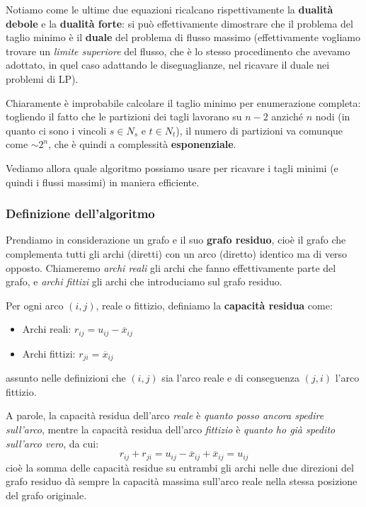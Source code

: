 \documentclass[a4paper,11pt]{article}
\begin{document}
Notiamo come le ultime due equazioni ricalcano rispettivamente la \textbf{dualità debole} e la \textbf{dualità forte}: si può effettivamente dimostrare che il problema del taglio minimo è il \textbf{duale} del problema di flusso massimo (effettivamente vogliamo trovare un \textit{limite superiore} del flusso, che è lo stesso procedimento che avevamo adottato, in quel caso adattando le diseguaglianze, nel ricavare il duale nei problemi di LP).

Chiaramente è improbabile calcolare il taglio minimo per enumerazione completa: togliendo il fatto che le partizioni dei tagli lavorano su $n-2$ anziché $n$ nodi (in quanto ci sono i vincoli $s \in N_s$ e $t \in N_t$), il numero di partizioni va comunque come $\sim 2^n$, che è quindi a complessità \textbf{esponenziale}.

Vediamo allora quale algoritmo possiamo usare per ricavare i tagli minimi (e quindi i flussi massimi) in maniera efficiente.

\subsubsection{Definizione dell'algoritmo}
Prendiamo in considerazione un grafo e il suo \textbf{grafo residuo}, cioè il grafo che complementa tutti gli archi (diretti) con un arco (diretto) identico ma di verso opposto. 
Chiameremo \textit{archi reali} gli archi che fanno effettivamente parte del grafo, e \textit{archi fittizi} gli archi che introduciamo sul grafo residuo. 

Per ogni arco $(i,j)$, reale o fittizio, definiamo la \textbf{capacità residua} come:
\begin{itemize}
	\item Archi reali: $r_{ij} = u_{ij} - \overline{x}_{ij}$
	\item Archi fittizi: $r_{ji} = \overline{x}_{ij}$
\end{itemize}
assunto nelle definizioni che $(i, j)$ sia l'arco reale e di conseguenza $(j, i)$ l'arco fittizio.

A parole, la capacità residua dell'arco \textit{reale} è \textit{quanto posso ancora spedire sull'arco}, mentre la capacità residua dell'arco \textit{fittizio} è \textit{quanto ho già spedito sull'arco vero}, da cui:
$$
r_{ij} + r_{ji} = u_{ij} - \overline{x}_{ij} + \overline{x}_{ij} = u_{ij}
$$
cioè la somma delle capacità residue su entrambi gli archi nelle due direzioni del grafo residuo dà sempre la capacità massima sull'arco reale nella stessa posizione del grafo originale.
\end{document}
